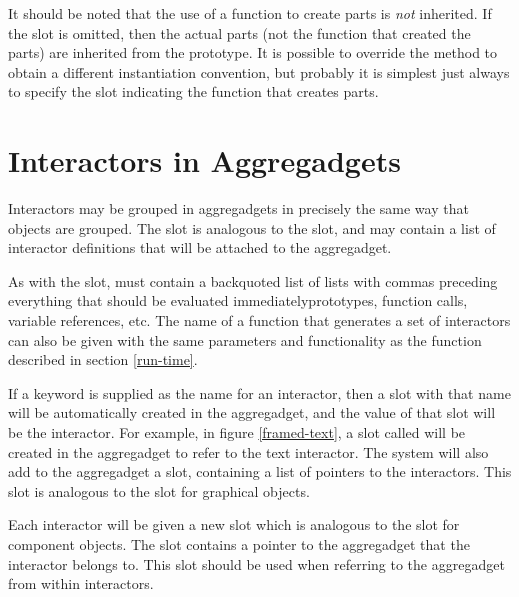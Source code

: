 It should be noted that the use of a function to create parts is {\it not}
inherited.  If the  slot is omitted, then the actual parts (not
the function that created the parts) are inherited from the prototype.  It
is possible to override the  method to obtain a different
instantiation convention, but probably it is simplest just always to specify
the  slot indicating the function that creates parts.


\section{Interactors in Aggregadgets}
\label{agg-interactors}

Interactors may be grouped in aggregadgets in precisely the same way that
objects are grouped.  The slot  is analogous to the
 slot, and may contain a list of interactor definitions that
will be attached to the aggregadget.

As with the  slot,  must contain a backquoted
list of lists with commas preceding everything that should be evaluated
immediately\value{dash}prototypes, function calls, variable references, etc.
The name of a function that generates a set of interactors can also be
given with the same parameters and functionality as the 
function described in section \ref{run-time}.

If a keyword is supplied as the name for an interactor, then a slot with
that name will be
automatically created in the aggregadget, and the value of that slot will
be the interactor.  For example, in figure \ref{framed-text}, a slot
called  will be created in the aggregadget to refer to
the text interactor.
The system will also add to the aggregadget a  slot, containing
a list of pointers to the interactors.  This slot is analogous to the
 slot for graphical objects.


Each interactor will be given a new  slot which is
analogous to the  slot for component objects.  The
 slot contains a pointer to the aggregadget that the
interactor belongs to.  This slot should be used when referring to the
aggregadget from within interactors.

